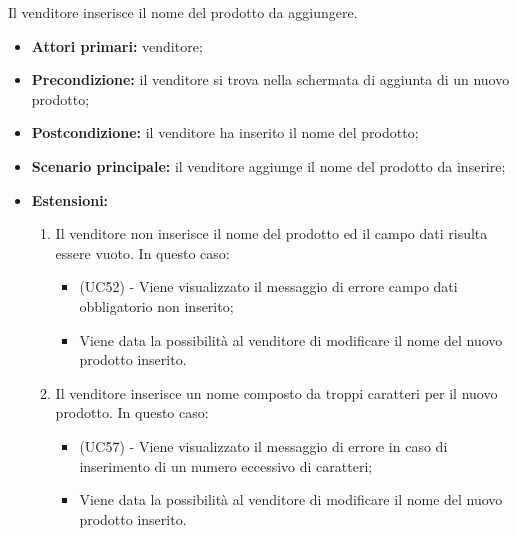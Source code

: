 Il venditore inserisce il nome del prodotto da aggiungere.
\begin{itemize}
    \item \textbf{Attori primari:} venditore;
    \item \textbf{Precondizione:} il venditore si trova nella schermata di aggiunta di un nuovo prodotto;
    \item \textbf{Postcondizione:} il venditore ha inserito il nome del prodotto;
    \item \textbf{Scenario principale:} il venditore aggiunge il nome del prodotto da inserire;
    \item \textbf{Estensioni:} 
    \begin{enumerate}[label=\lett]
    	\item Il venditore non inserisce il nome del prodotto ed il campo dati risulta essere vuoto. In questo caso:
	    \begin{itemize}
	        \item (UC52) - Viene visualizzato il messaggio di errore campo dati obbligatorio non inserito;
	        \item Viene data la possibilità al venditore di modificare il nome del nuovo prodotto inserito.
	    \end{itemize}
    	\item Il venditore inserisce un nome composto da troppi caratteri per il nuovo prodotto. In questo caso:
    	\begin{itemize}
    		\item (UC57) - Viene visualizzato il messaggio di errore in caso di inserimento di un numero eccessivo di caratteri;
    		\item Viene data la possibilità al venditore di modificare il nome del nuovo prodotto inserito.
    	\end{itemize}
	\end{enumerate}
\end{itemize}

